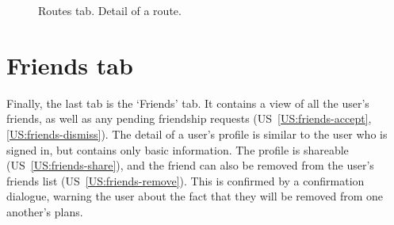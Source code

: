 \begin{figure}[h!]
    \centering
    \hfill
    \hfill
    \caption{Routes tab. Detail of a route.}
    \label{fig:routes}
\end{figure}

\section{Friends tab}
Finally, the last tab is the `Friends' tab.
It contains a view of all the user's friends, as well as any pending friendship requests (US~\ref{US:friends-accept}, \ref{US:friends-dismiss}).
The detail of a user's profile is similar to the user who is signed in, but contains only basic information.
The profile is shareable (US~\ref{US:friends-share}), and the friend can also be removed from the user's friends list (US~\ref{US:friends-remove}).
This is confirmed by a confirmation dialogue, warning the user about the fact that they will be removed from one another's plans.


